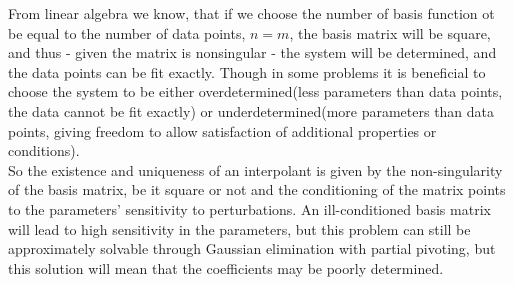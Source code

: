 \documentclass[../../CompleteThesis/Complete_1stDraft.tex]{subfiles}
\begin{document}
	From linear algebra we know, that if we choose the number of basis function ot be equal to the number of data points, $n=m$, the basis matrix will be square, and thus - given the matrix is nonsingular - the system will be determined, and the data points can be fit exactly. Though in some problems it is beneficial to choose the system to be either overdetermined(less parameters than data points, the data cannot be fit exactly) or underdetermined(more parameters than data points, giving freedom to allow satisfaction of additional properties or conditions).\\ 
	So the existence and uniqueness of an interpolant is given by the non-singularity of the basis matrix, be it square or not and the conditioning of the matrix points to the parameters' sensitivity to perturbations. An ill-conditioned basis matrix will lead to high sensitivity in the parameters, but this problem can still be approximately solvable through Gaussian elimination with partial pivoting, but this solution will mean that the coefficients may be poorly determined.
	
\end{document}
